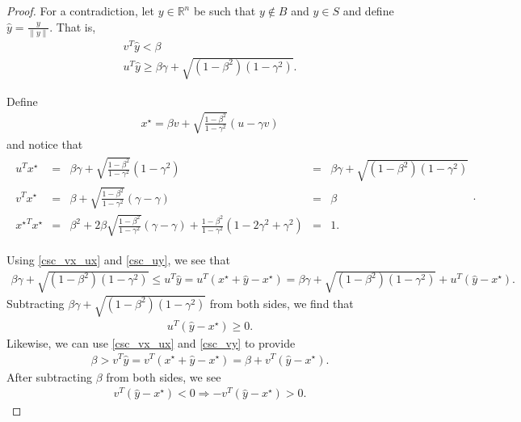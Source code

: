 \documentclass{article}
\theoremstyle{case}
\numberwithin{theorem}{subsection}
\newcommand{\Rn}{\mathbb R^n}
\begin{document}
\begin{proof}
For a contradiction, let $y \in \Rn$ be such that $y \not \in B$ and $y \in S$ and define $\hat y = \frac{y}{\|y\|}$.
That is,
\begin{align}
v^T\hat y < \beta \label{csc_vy} \\
u^T\hat y \ge \beta\gamma + \sqrt{\left(1 - \beta^2\right)\left(1 - \gamma^2\right)}. \label{csc_uy}
\end{align}

Define
\begin{align*}
x^{\star} = \beta v + \sqrt{\frac{1 - \beta^2}{1 - \gamma^2}} (u - \gamma v )
\end{align*} and notice that
\begin{align}
\begin{array}{ccccc}
{u}^Tx^{\star} &=& \beta\gamma + \sqrt{\frac{1 - \beta^2}{1 - \gamma^2}} (1 - \gamma^2) &=&  \beta\gamma + \sqrt{\left(1 - \beta^2\right)\left(1 - \gamma^2\right)} \\
{v}^Tx^{\star} &=& \beta + \sqrt{\frac{1 - \beta^2}{1 - \gamma^2}}(\gamma - \gamma) &=& \beta \\
{x^{\star}}^Tx^{\star} &=& \beta^2 + 2\beta\sqrt{\frac{1 - \beta^2}{1 - \gamma^2}}(\gamma - \gamma) + \frac{1 - \beta^2}{1 - \gamma^2} (1- 2\gamma^2 + \gamma^2)&=& 1.
\end{array}. \label{csc_vx_ux}
\end{align}

Using \cref{csc_vx_ux} and \cref{csc_uy}, we see that
\begin{align*}
\beta\gamma + \sqrt{\left(1 - \beta^2\right)\left(1 - \gamma^2\right)} \le {u}^T\hat y = {u}^T\left(x^{\star} + \hat y - x^{\star}\right) 
= \beta \gamma + \sqrt{(1 - \beta^2)\left(1 - \gamma^2\right)} + {u}^T\left(\hat y - x^{\star}\right).
\end{align*}
Subtracting $\beta\gamma + \sqrt{\left(1 - \beta^2\right)\left(1 - \gamma^2\right)}$ from both sides, we find that
\begin{align}
{u}^T\left(\hat y - x^{\star}\right) \ge 0 \label{csc_uymx}.
\end{align}
Likewise, we can use \cref{csc_vx_ux} and \cref{csc_vy} to provide
\begin{align*}
\beta > {v}^T\hat y = {v}^T\left(x^{\star} + \hat y - x^{\star}\right) = \beta + {v}^T\left(\hat y - x^{\star}\right).
\end{align*}
After subtracting $\beta$ from both sides, we see
\begin{align}
{v}^T\left(\hat y - x^{\star}\right) < 0 \Longrightarrow -{v}^T\left(\hat y - x^{\star}\right) > 0. \label{csc_vymx}
\end{align}


\end{proof}
\end{document}
